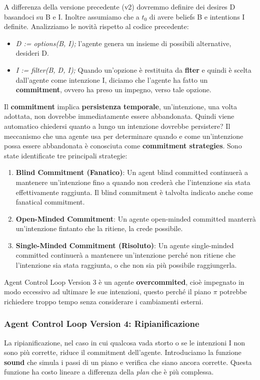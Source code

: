 A differenza della versione precedente (v2) dovremmo definire dei desires D basandoci su B e I. Inoltre assumiamo che a $t_0$ di avere beliefs B e intentions I definite.
Analizziamo le novità rispetto al codice precedente:
\begin{itemize}
    \item \textit{D := options(B, I);} l'agente genera un insieme di possibili alternative, desideri D.
    \item \textit{I := filter(B, D, I);} Quando un'opzione è restituita da \textbf{flter} e quindi è scelta dall'agente come intenzione I, diciamo che l'agente ha fatto un \textbf{commitment}, ovvero ha preso un impegno, verso tale opzione. 
\end{itemize}

Il \textbf{commitment} implica \textbf{persistenza temporale}, un'intenzione, una volta adottata, non dovrebbe immediatamente essere abbandonata. Quindi viene automatico chiedersi quanto a lungo un intenzione dovrebbe persistere? Il meccanismo che una agente usa per determinare quando e come un'intenzione possa essere abbandonata è conosciuta come \textbf{commitment strategies}.
Sono state identificate tre principali strategie:
\begin{enumerate}
    \item \textbf{Blind Commitment (Fanatico)}: Un agent blind committed continuerà a mantenere un'intenzione fino a quando non crederà che l'intenzione sia stata effettivamente raggiunta. Il blind commitment è talvolta indicato anche come fanatical commitment.
    \item \textbf{Open-Minded Commitment}: Un agente open-minded committed manterrà un'intenzione fintanto che la ritiene, la crede possibile.
    \item \textbf{Single-Minded Commitment (Risoluto)}: Un agente single-minded committed continuerà a mantenere un'intenzione perché non ritiene che l'intenzione sia stata raggiunta, o che non sia più possibile raggiungerla.
\end{enumerate}

Agent Control Loop Version 3 è un agente \textbf{overcommited}, cioè impegnato in modo eccessivo ad ultimare le sue intenzioni, questo perché il piano $\pi$ potrebbe richiedere troppo tempo senza considerare i cambiamenti esterni.

\subsubsection{Agent Control Loop Version 4: Ripianificazione}
La ripianificazione, nel caso in cui qualcosa vada storto o se le intenzioni I non sono più corrette, riduce il commitment dell'agente.
Introduciamo la funzione \textbf{sound} che simula i passi di un piano e verifica che siano ancora corrette. Questa funzione ha costo lineare a differenza della \textit{plan} che è più complessa.

